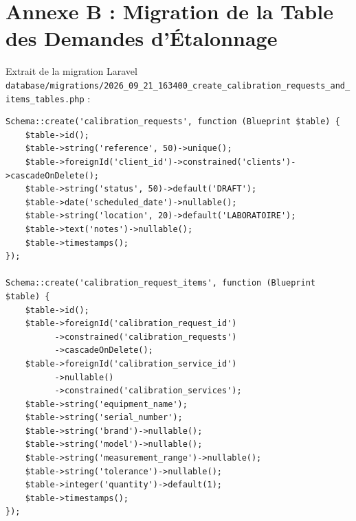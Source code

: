 \documentclass{bts-report}
\begin{document}
\section*{Annexe B : Migration de la Table des Demandes d'\'Etalonnage}
Extrait de la migration Laravel \texttt{database/migrations/2026\_09\_21\_163400\_create\_calibration\_requests\_and\_items\_tables.php} :
\begin{verbatim}
Schema::create('calibration_requests', function (Blueprint $table) {
    $table->id();
    $table->string('reference', 50)->unique();
    $table->foreignId('client_id')->constrained('clients')->cascadeOnDelete();
    $table->string('status', 50)->default('DRAFT');
    $table->date('scheduled_date')->nullable();
    $table->string('location', 20)->default('LABORATOIRE');
    $table->text('notes')->nullable();
    $table->timestamps();
});

Schema::create('calibration_request_items', function (Blueprint $table) {
    $table->id();
    $table->foreignId('calibration_request_id')
          ->constrained('calibration_requests')
          ->cascadeOnDelete();
    $table->foreignId('calibration_service_id')
          ->nullable()
          ->constrained('calibration_services');
    $table->string('equipment_name');
    $table->string('serial_number');
    $table->string('brand')->nullable();
    $table->string('model')->nullable();
    $table->string('measurement_range')->nullable();
    $table->string('tolerance')->nullable();
    $table->integer('quantity')->default(1);
    $table->timestamps();
});
\end{verbatim}
\end{document}
